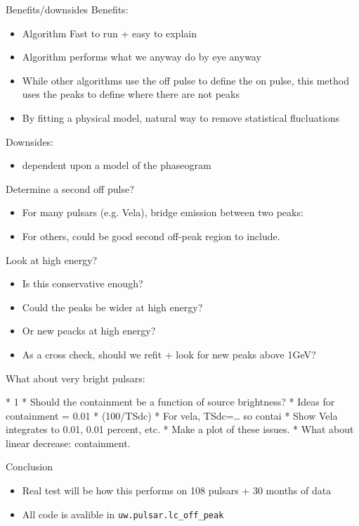 \documentclass[12pt]{beamer}
\begin{document}
\begin{frame}{Benefits/downsides}
  Benefits:
  \begin{itemize}
    \item Algorithm Fast to run + easy to explain
    \item Algorithm performs what we anyway do by eye anyway
    \item While other algorithms use the off pulse to define
      the on pulse, this method uses the peaks to
      define where there are not peaks
    \item By fitting a physical model, natural way to
      remove statistical flucluations
  \end{itemize}
  Downsides: 
  \begin{itemize}
    \item dependent upon a model of the phaseogram
  \end{itemize}

\end{frame}

\begin{frame}{Determine a second off pulse?}
  \begin{itemize}
    \item For many pulsars (e.g. Vela), bridge emission between two peaks:
    \item For others, could be good second off-peak region to include.
  \end{itemize}
\end{frame}


\begin{frame}{Look at high energy?}
  \begin{itemize}
    \item Is this conservative enough?
    \item Could the peaks be wider at high energy?
    \item Or new peacks at high energy?
    \item As a cross check, should we refit + look for new peaks above 1GeV?
  \end{itemize}
\end{frame}






\begin{frame}{What about very bright pulsars:}

   * 1%
   * Should the containment be a function of source brightness?
   * Ideas for containment = 0.01 * (100/TSdc)
      * For vela, TSdc=… so contai
   * Show Vela integrates to 0.01, 0.01 percent, etc.
   * Make a plot of these issues.
   * What about linear decrease: containment.
\end{frame}


\begin{frame}{Conclusion}
  \begin{itemize}
  \item Real test will be how this performs on 108 pulsars + 30 months of data
  \item All code is avalible in \texttt{uw.pulsar.lc\_off\_peak}
  \end{itemize}
\end{frame}
\end{document}
